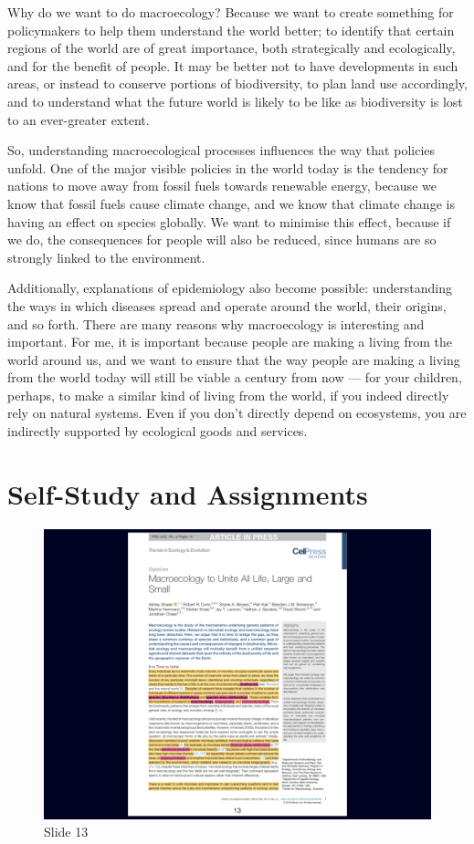 \documentclass[
  10pt,
]{book}
\begin{document}
Why do we want to do macroecology? Because we want to create something
for policymakers to help them understand the world better; to identify
that certain regions of the world are of great importance, both
strategically and ecologically, and for the benefit of people. It may be
better not to have developments in such areas, or instead to conserve
portions of biodiversity, to plan land use accordingly, and to
understand what the future world is likely to be like as biodiversity is
lost to an ever-greater extent.

So, understanding macroecological processes influences the way that
policies unfold. One of the major visible policies in the world today is
the tendency for nations to move away from fossil fuels towards
renewable energy, because we know that fossil fuels cause climate
change, and we know that climate change is having an effect on species
globally. We want to minimise this effect, because if we do, the
consequences for people will also be reduced, since humans are so
strongly linked to the environment.

Additionally, explanations of epidemiology also become possible:
understanding the ways in which diseases spread and operate around the
world, their origins, and so forth. There are many reasons why
macroecology is interesting and important. For me, it is important
because people are making a living from the world around us, and we want
to ensure that the way people are making a living from the world today
will still be viable a century from now --- for your children, perhaps,
to make a similar kind of living from the world, if you indeed directly
rely on natural systems. Even if you don't directly depend on
ecosystems, you are indirectly supported by ecological goods and
services.

\section{Self-Study and Assignments}\label{self-study-and-assignments}

\begin{figure}[ht]
\centering
\includegraphics[width=0.8\linewidth]{../images/BDC334/BDC334-013.jpeg}
\caption*{Slide 13}
\end{figure}
\end{document}
